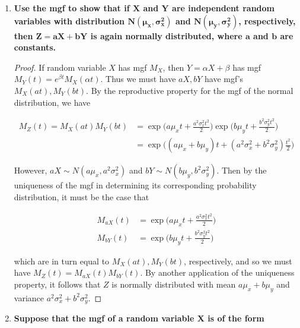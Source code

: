 \documentclass[10pt, oneside]{article}
\begin{document}
\begin{enumerate}[label=10.\arabic*]
\begin{enumerate}
	\end{enumerate}

\item  \begin{tcolorbox}[
  colback=Cerulean!5!white,
  colframe=Cerulean!75!black]
\textbf{Use the mgf to show that if $\bm{X}$ and $\bm{Y}$ are independent random variables with distribution $\bm{N(\mu_x, \sigma^2_x)}$ and $\bm{N(\mu_y, \sigma^2_y)}$, respectively, then $\bm{Z = aX + bY}$ is again normally distributed, where $\bm{a}$ and $\bm{b}$ are constants.}
\end{tcolorbox}

\begin{proof}
If random variable $X$ has mgf $M_X$, then $Y = \alpha X + \beta$ has mgf $M_Y(t) = e^{\beta t} M_X (\alpha t)$. Thus we must have $aX, bY$ have mgf's $M_X(at), M_Y(bt)$. By the reproductive property for the mgf of the normal distribution, we have

\begin{align*} 
M_Z(t) = M_X(at) M_Y(bt) &= \exp \bigg( a\mu_x t + \frac{a^2 \sigma^2_x t^2}{2} \bigg) \exp \bigg( b\mu_y t + \frac{b^2 \sigma^2_y t^2}{2} \bigg) \\
&= \exp \bigg( (a\mu_x + b\mu_y) t + (a^2 \sigma^2_x + b^2 \sigma^2_y) \frac{t^2}{2} \bigg)
\end{align*}

However, $aX \sim N(a\mu_x, a^2 \sigma^2_x)$ and $bY \sim N(b\mu_y, b^2 \sigma^2_y)$. Then by the uniqueness of the mgf in determining its corresponding probability distribution, it must be the case that

\begin{align*}
M_{aX} (t) &= \exp \bigg( a\mu_x t + \frac{a^2 \sigma^2_x t^2}{2} \bigg) \\
M_{bY} (t) &= \exp \bigg( b\mu_y t + \frac{b^2 \sigma^2_y t^2}{2} \bigg)
\end{align*}

which are in turn equal to $M_X(at), M_Y(bt)$, respectively, and so we must have $M_Z(t) = M_{aX} (t) M_{bY}(t)$. By another application of the uniqueness property, it follows that $Z$ is normally distributed with mean $\boxed{a\mu_x + b\mu_y}$ and variance $\boxed{a^2 \sigma^2_x + b^2 \sigma^2_y}$.

\end{proof}

\item  \begin{tcolorbox}[
  colback=Cerulean!5!white,
  colframe=Cerulean!75!black]
\textbf{Suppose that the mgf of a random variable $\bm{X}$ is of the form}


\end{tcolorbox}
\end{enumerate}
\end{document}

